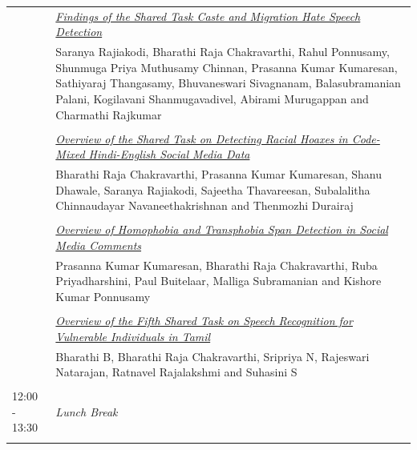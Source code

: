 \documentclass[11pt,oneside]{book}
\begin{document}
\begin{tabular}{p{24mm}p{124mm}}
                
                      & \hyperlink{page.214}{\emph{Findings of the Shared Task Caste and Migration Hate Speech Detection}}\\
        & Saranya Rajiakodi\index{Rajiakodi}, Bharathi Raja Chakravarthi\index{Chakravarthi}, Rahul Ponnusamy\index{Ponnusamy}, Shunmuga Priya Muthusamy Chinnan\index{Chinnan}, Prasanna Kumar Kumaresan\index{Kumaresan}, Sathiyaraj Thangasamy\index{Thangasamy}, Bhuvaneswari Sivagnanam\index{Sivagnanam}, Balasubramanian Palani\index{Palani}, Kogilavani Shanmugavadivel\index{Shanmugavadivel}, Abirami Murugappan\index{Murugappan} and Charmathi Rajkumar\index{Rajkumar}\\\\
                
                      & \hyperlink{page.221}{\emph{Overview of the Shared Task on Detecting Racial Hoaxes in Code-Mixed Hindi-English Social Media Data}}\\
        & Bharathi Raja Chakravarthi\index{Chakravarthi}, Prasanna Kumar Kumaresan\index{Kumaresan}, Shanu Dhawale\index{Dhawale}, Saranya Rajiakodi\index{Rajiakodi}, Sajeetha Thavareesan\index{Thavareesan}, Subalalitha Chinnaudayar Navaneethakrishnan\index{Navaneethakrishnan} and Thenmozhi Durairaj\index{Durairaj}\\\\
                
                      & \hyperlink{page.228}{\emph{Overview of Homophobia and Transphobia Span Detection in Social Media Comments}}\\
        & Prasanna Kumar Kumaresan\index{Kumaresan}, Bharathi Raja Chakravarthi\index{Chakravarthi}, Ruba Priyadharshini\index{Priyadharshini}, Paul Buitelaar\index{Buitelaar}, Malliga Subramanian\index{Subramanian} and Kishore Kumar Ponnusamy\index{Ponnusamy}\\\\
                
                      & \hyperlink{page.234}{\emph{Overview of the Fifth Shared Task on Speech Recognition for Vulnerable Individuals in Tamil}}\\
        & Bharathi B\index{B}, Bharathi Raja Chakravarthi\index{Chakravarthi}, Sripriya N\index{N}, Rajeswari Natarajan\index{Natarajan}, Ratnavel Rajalakshmi\index{Rajalakshmi} and Suhasini S\index{S}\\\\
                        12:00 - 13:30 & \emph{Lunch Break}\\\\
      
              \end{tabular}
    \newpage
      
\end{document}
